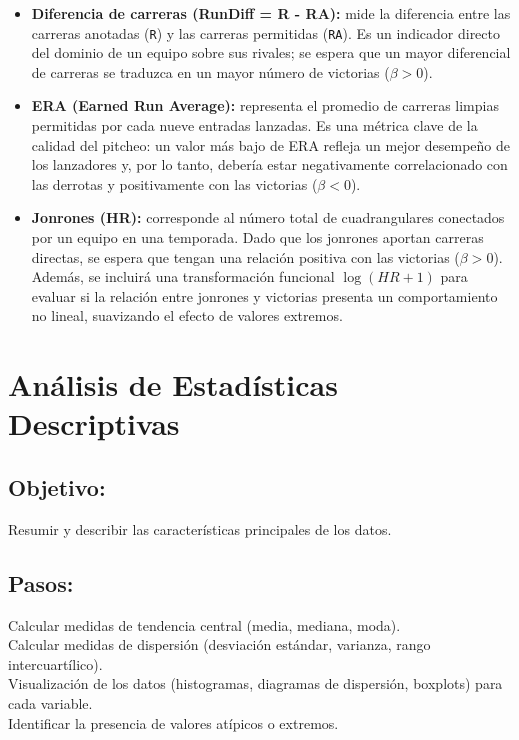\documentclass[10pt]{article}
\begin{document}
\begin{itemize}
    \item \textbf{Diferencia de carreras (RunDiff = R - RA):} mide la diferencia entre las carreras anotadas (\texttt{R}) y las carreras permitidas (\texttt{RA}). Es un indicador directo del dominio de un equipo sobre sus rivales; se espera que un mayor diferencial de carreras se traduzca en un mayor número de victorias (\(\beta > 0\)). 
    \item \textbf{ERA (Earned Run Average):} representa el promedio de carreras limpias permitidas por cada nueve entradas lanzadas. Es una métrica clave de la calidad del pitcheo: un valor más bajo de ERA refleja un mejor desempeño de los lanzadores y, por lo tanto, debería estar negativamente correlacionado con las derrotas y positivamente con las victorias (\(\beta < 0\)). 
    \item \textbf{Jonrones (HR):} corresponde al número total de cuadrangulares conectados por un equipo en una temporada. Dado que los jonrones aportan carreras directas, se espera que tengan una relación positiva con las victorias (\(\beta > 0\)). Además, se incluirá una transformación funcional \(\log(HR+1)\) para evaluar si la relación entre jonrones y victorias presenta un comportamiento no lineal, suavizando el efecto de valores extremos.
\end{itemize}
\section{Análisis de Estadísticas Descriptivas}
\subsection{Objetivo:}
Resumir y describir las características principales de los datos.

\subsection{Pasos:}
Calcular medidas de tendencia central (media, mediana, moda). \\
Calcular medidas de dispersión (desviación estándar, varianza, rango intercuartílico). \\
Visualización de los datos (histogramas, diagramas de dispersión, boxplots) para cada variable. \\
Identificar la presencia de valores atípicos o extremos.
\end{document}
